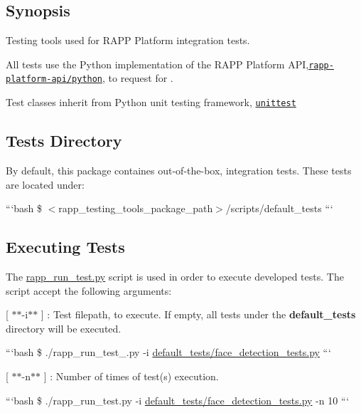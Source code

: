 \subsection*{Synopsis}

Testing tools used for R\-A\-P\-P Platform integration tests.

All tests use the Python implementation of the R\-A\-P\-P Platform A\-P\-I,\href{https://github.com/rapp-project/rapp-api/tree/master/python}{\tt rapp-\/platform-\/api/python}, to request for .

Test classes inherit from Python unit testing framework, \href{https://docs.python.org/2.7/library/unittest.html}{\tt unittest}

\subsection*{Tests Directory}

By default, this package containes out-\/of-\/the-\/box, integration tests. These tests are located under\-:

```bash \$ $<$rapp\-\_\-testing\-\_\-tools\-\_\-package\-\_\-path$>$/scripts/default\-\_\-tests ```

\subsection*{Executing Tests}

The \hyperlink{rapp__run__test_8py}{rapp\-\_\-run\-\_\-test.\-py} script is used in order to execute developed tests. The script accept the following arguments\-:


\begin{DoxyItemize}
\item \mbox{[} $\ast$$\ast$-\/i$\ast$$\ast$ \mbox{]} \-: Test filepath, to execute. If empty, all tests under the {\bfseries default\-\_\-tests} directory will be executed.
\end{DoxyItemize}

```bash \$ ./rapp\-\_\-run\-\_\-test\-\_\-.py -\/i \hyperlink{face__detection__tests_8py}{default\-\_\-tests/face\-\_\-detection\-\_\-tests.\-py} ```


\begin{DoxyItemize}
\item \mbox{[} $\ast$$\ast$-\/n$\ast$$\ast$ \mbox{]} \-: Number of times of test(s) execution.
\end{DoxyItemize}

```bash \$ ./rapp\-\_\-run\-\_\-test.py -\/i \hyperlink{face__detection__tests_8py}{default\-\_\-tests/face\-\_\-detection\-\_\-tests.\-py} -\/n 10 ```


